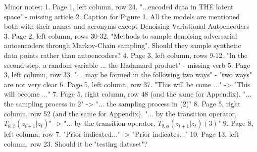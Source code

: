 \documentclass{article}
\begin{document}
Minor notes:
1. Page 1, left column, row 24. "...encoded data in THE latent space" - missing article
2. Caption for Figure 1. All the models are mentioned both with their names and acronyms except Denoising Variational Autoencoders
3. Page 2, left column, rows 30-32. "Methods to sample denoising adversarial autoencoders through Markov-Chain sampling". Should they sample synthetic data points rather than autoencoders?
4. Page 3, left column, rows 9-12. "In the second step, a random variable ... the Hadamard product" - missing verb
5. Page 3, left column, row 33. "... may be formed in the following two ways" - "two ways" are not very clear
6. Page 5, left column, row 37. "This will be come ..." -> "This will become ..."
7. Page 5, right column, row 48 (and the same for Appendix). "... the sampling process in 2" -> "... the sampling process in (2)"
8. Page 5, right column, row 52 (and the same for Appendix). "... by the transition operator, $T_{\theta, \phi}(z_{t+1}|z_t)$" -> "... by the transition operator, $T_{\theta, \phi}(z_{t+1}|z_t) (3)$"
9. Page 8, left column, row 7. "Prior indicated..." -> "Prior indicates..."
10. Page 13, left column, row 23. Should it be "testing dataset"?
\end{document}
